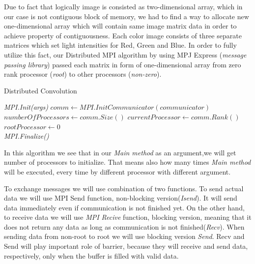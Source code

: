 \documentclass{article}
\begin{document}
Due to fact that logically image is consisted as two-dimensional array, which in our case is not contiguous block of memory, we had to find a way to allocate new one-dimensional array which will contain same image matrix data in order to achieve property of contiguousness.  Each color image consists of three separate matrices which set light intensities for Red, Green and Blue. In order to fully utilize this fact, our Distributed MPI algorithm by using MPJ Express (\textit{message passing library}) passed each matrix in form of one-dimensional array from zero rank processor (\textit{root}) to other processors (\textit{non-zero}).

\setlength{\textfloatsep}{0pt}
\begin{algorithm}[tbph]
\caption{Distributed Convolution}
\begin{algorithmic}[1]
\State \textit{MPI.Init(args)}
\State \textit{$comm \gets MPI.InitCommunicator(communicator)$}\\
\State \textit{$numberOfProcessors \gets comm.Size()$}
\State \textit{$currentProcessor \gets comm.Rank()$}\\
\State \textit{$rootProcessor \gets 0$}\\
       \State {}
    \EndIf
    \State \call\textit{ MPI.Finalize()}
\endFunction

\end{algorithmic}
\end{algorithm}
 In this algorithm we see that in our \textit{Main method} as an argument,we will get number of processors to initialize. That means also how many times \textit{Main method} will be executed, every time by different processor with different argument.

To exchange messages we will use combination of two functions. To send actual data we will use MPI  Send function, non-blocking version(\textit{Isend}). It will send data immediately even if communication is not finished yet. On the other hand, to receive data we will use \textit{MPI Recive} function, blocking version, meaning that it does not return any data as long as communication is not finished(\textit{Recv}). When sending data from non-root to root we will use blocking version \textit{Send}. Recv and Send will play important role of barrier, because they will receive and send data, respectively, only when the buffer is filled with valid data.
\end{document}
